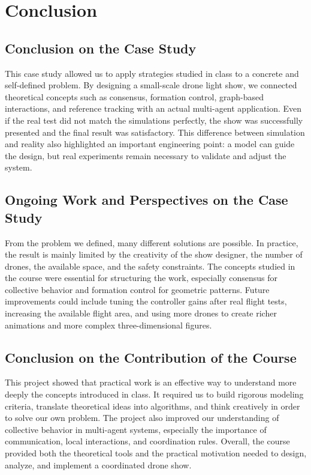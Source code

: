 \chapter{Conclusion}
\label{ch:Conclusion} 

\section{Conclusion on the Case Study}

This case study allowed us to apply strategies studied in class to a concrete and self-defined problem. By designing a small-scale drone light show, we connected theoretical concepts such as consensus, formation control, graph-based interactions, and reference tracking with an actual multi-agent application. Even if the real test did not match the simulations perfectly, the show was successfully presented and the final result was satisfactory. This difference between simulation and reality also highlighted an important engineering point: a model can guide the design, but real experiments remain necessary to validate and adjust the system.

\section{Ongoing Work and Perspectives on the Case Study}

From the problem we defined, many different solutions are possible. In practice, the result is mainly limited by the creativity of the show designer, the number of drones, the available space, and the safety constraints. The concepts studied in the course were essential for structuring the work, especially consensus for collective behavior and formation control for geometric patterns. Future improvements could include tuning the controller gains after real flight tests, increasing the available flight area, and using more drones to create richer animations and more complex three-dimensional figures.

\section{Conclusion on the Contribution of the Course}

This project showed that practical work is an effective way to understand more deeply the concepts introduced in class. It required us to build rigorous modeling criteria, translate theoretical ideas into algorithms, and think creatively in order to solve our own problem. The project also improved our understanding of collective behavior in multi-agent systems, especially the importance of communication, local interactions, and coordination rules. Overall, the course provided both the theoretical tools and the practical motivation needed to design, analyze, and implement a coordinated drone show.
